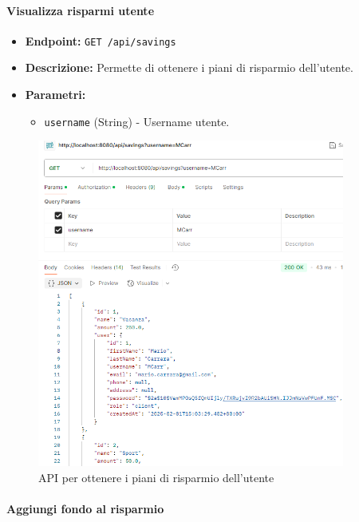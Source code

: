 \paragraph{Visualizza risparmi utente} 

\begin{itemize}
    \item \textbf{Endpoint:} \texttt{GET /api/savings}
    \item \textbf{Descrizione:} Permette di ottenere i piani di risparmio dell'utente.
    \item \textbf{Parametri:}
    \begin{itemize}
        \item \texttt{username} (String) - Username utente.
    \end{itemize}
\end{itemize}

\begin{figure}[H]
    \centering
    \includegraphics[width=0.9\textwidth]{images/GetSavingsAPI.png}
    \caption{API per ottenere i piani di risparmio dell'utente}
    \label{fig: GetSavingAPI}
\end{figure}

\paragraph{Aggiungi fondo al risparmio} 

